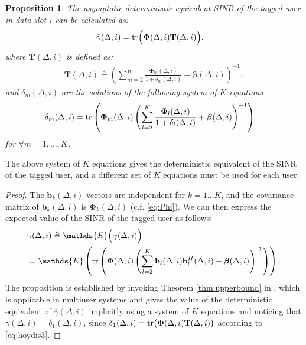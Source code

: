 \documentclass[conference, a4paper, 10pt]{IEEEtran}
\newtheorem{prop}{Proposition}
\newcommand{\mx}[1]{\mathbf{#1}}
\newcommand{\bs}[1]{\boldsymbol{#1}}
\begin{document}
\begin{prop}
\label{Prop:SINR}
The asymptotic deterministic equivalent \ac{SINR} of the tagged user in data slot $i$ can be calculated as:
\begin{align}
\label{eq:hoydis1}
\bar{\gamma}(\Delta, i) &= \textup{tr}\Big( \bs{\Phi}(\Delta, i)\mx{T}(\Delta, i)  \Big),
\end{align}
where $\mx{T}(\Delta, i)$ is defined as: %
\begin{align}
\label{eq:hoydis2}
\mx{T}(\Delta, i) \triangleq \left( \sum_{m = 2}^{K} \frac{\bs{\Phi}_m(\Delta, i)}{1 + \delta_m(\Delta, i)} + \bs{\beta}(\Delta, i) \right)^{-1},
\end{align}
and $\delta_m(\Delta, i)$ are the solutions of the following system of $K$ equations
\begin{align}
\label{eq:hoydis3}
\delta_m(\Delta, i) &= \textup{tr}\left(\bs{\Phi}_m(\Delta, i)
\left( \sum_{l = 2}^{K} \frac{\bs{\Phi}_l(\Delta, i)}{1 + \delta_l(\Delta, i)} + \bs{\beta}(\Delta, i)  \right)^{-1} \right)
\end{align}
for $\forall m = 1, \ldots, K$.
\end{prop}
The above system of $K$ equations gives the deterministic equivalent of the \ac{SINR} of the tagged user,
and a different set of $K$ equations must be used for each user.
\begin{proof}
The $\mx{b}_k(\Delta, i)$ vectors are independent for $k = 1 \ldots K$,
and the covariance matrix of $\mx{b}_k(\Delta, i)$ is $\bs{\Phi}_k(\Delta, i)$
(c.f. \eqref{eq:Phi}).
We can then express the expected value of the \ac{SINR} of the tagged user as follows:
\begin{align}
\label{eq:gammaB}
& \bar{\gamma}(\Delta, i) \triangleq \mathds{E}\Big(\gamma(\Delta, i)\Big)   \\
&= \mathds{E}\left( \textup{tr}\left( \bs{\Phi}(\Delta, i)  \left( \sum_{l = 2}^K  \mx{b}_l(\Delta, i) \mx{b}_l^H(\Delta, i)  +\bs{\beta}(\Delta, i) \right)^{\!\!-1}  \right) \right).
\nonumber
\end{align}
The proposition is established
by invoking Theorem \ref{thm:upperbound} in \cite{Wagner:2012}, which is applicable in multiuser systems and
gives the value of the deterministic equivalent of $\bar{\gamma}(\Delta, i)$
implicitly using a system of $K$ equations and noticing that
$\bar{\gamma}(\Delta, i) = \delta_1(\Delta, i)$, since $\delta_1(\Delta, i)=\textup{tr}\big( \bs{\Phi}(\Delta, i) \mx{T}(\Delta, i)\big)$ according to \eqref{eq:hoydis3}.
\end{proof}
\end{document}
